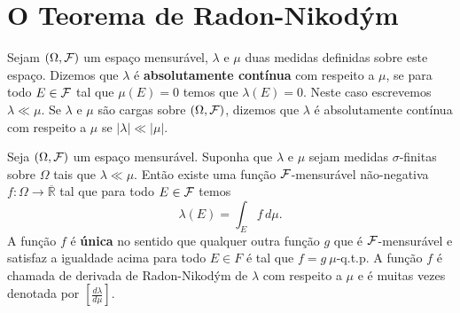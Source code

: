 \section{O Teorema de Radon-Nikodým}




\begin{definicao}\label{def-med-abs-cont.}
Sejam $(\Omega,\mathcal{F})$ um espaço mensurável, $\lambda$ e $\mu$
duas medidas definidas sobre este espaço. 
Dizemos que $\lambda$ é {\bf absolutamente contínua} 
com respeito a $\mu$, se para todo $E\in \mathcal{F}$
tal que $\mu(E)=0$ temos que $\lambda(E)=0$.
Neste caso escrevemos $\lambda \ll \mu$.
Se $\lambda$ e $\mu$ são cargas sobre $(\Omega,\mathcal{F})$,
dizemos que $\lambda$ é absolutamente contínua 
com respeito a $\mu$ se $|\lambda|\ll |\mu|$.
\end{definicao}







\begin{teorema}
\label{teo-radom-nikodym}
Seja $(\Omega,\mathcal{F})$ um espaço mensurável. Suponha que 
$\lambda$ e $\mu$ sejam medidas $\sigma$-finitas sobre $\Omega$ 
tais que $\lambda\ll \mu$. Então existe uma função 
$\mathcal{F}$-mensurável não-negativa $f:\Omega\to\overline{\mathbb{R}}$
tal que para todo $E\in\mathcal{F}$ temos
\[
\lambda(E) 
= 
\int_{E} f\, d\mu.
\]
A função $f$ é {\bf única} no sentido que qualquer 
outra função $g$ que é $\mathcal{F}$-mensurável 
e satisfaz a igualdade acima 
para todo $E\in F$ é tal que $f=g \ \mu$-q.t.p. 
A função $f$ é chamada de derivada de Radon-Nikodým 
de $\lambda$ com respeito a $\mu$ e é muitas vezes 
denotada por $\displaystyle\left[ \frac{d\lambda}{d\mu}\right]$.
\end{teorema}


